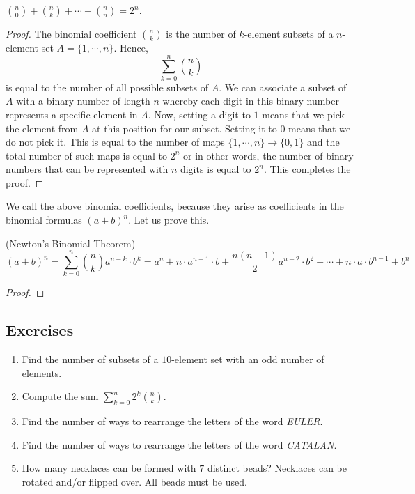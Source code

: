 \begin{proposition}
$\displaystyle {n \choose 0} + {n \choose k} + \cdots + {n \choose n}=2^n.$
\end{proposition}

\begin{proof}
The binomial coefficient ${n \choose k}$ is the number of $k$-element subsets of a $n$-element set $A=\{1, \cdots, n\}$. Hence,
$$
\sum_{k=0}^n {n \choose k}
$$
is equal to the number of all possible subsets of $A$. We can associate a subset of $A$ with a binary number of length $n$ 
whereby each digit in this binary number represents a specific element in $A$. Now, setting a digit to $1$ means that we pick the element from $A$ at this position
for our subset. Setting it to $0$ means that we do not pick it. This is equal to the number of maps $\{1, \cdots, n\} \to \{0,1\}$ and the total number of such maps is equal to $2^n$ or in other words, the number of binary numbers that
can be represented with $n$ digits is equal to $2^n$. This completes the proof.
\end{proof}

We call the above binomial coefficients, because they arise as coefficients in the binomial formulas $(a+b)^n$. Let us prove this.

\begin{theorem}(Newton's Binomial Theorem)
$$
(a+b)^n = \sum_{k=0}^n {n \choose k} a^{n-k} \cdot b^k=a^n+n \cdot a^{n-1} \cdot b+ \frac{n(n-1)}{2} a^{n-2} \cdot b^2+ \cdots + n \cdot a \cdot b^{n-1}+b^n
$$
\end{theorem}

\begin{proof}

\end{proof}


\subsection{Exercises}

\begin{enumerate}
    \item Find the number of subsets of a $10$-element set with an odd number of elements.
    \item Compute the sum $\displaystyle \sum_{k=0}^n 2^k {n \choose k}$.
    \item Find the number of ways to rearrange the letters of the word \textit{EULER}.
    \item Find the number of ways to rearrange the letters of the word \textit{CATALAN}.
    \item How many necklaces can be formed with $7$ distinct beads? Necklaces can be rotated and/or flipped over. All beads must be used.
\end{enumerate}